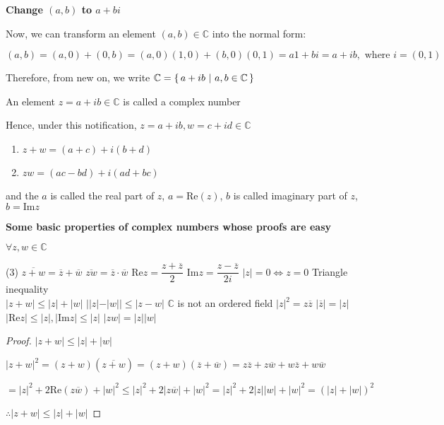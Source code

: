 \newpage

\textbf{Change $(a,b)$ to $a+bi$}

\begin{tcolorbox}
	Now, we can transform an element $(a,b) \in \mathbb C$ into the normal form:

$$(a,b) = (a,0)+(0,b) = (a,0)(1,0)+(b,0)(0,1) = a1+bi = a+ib, \text{ where } i = (0,1) $$

Therefore, from new on, we write $\mathbb C = \left\{ \,a+ib~|~a,b \in \mathbb C \,\right\}$

An element $z = a+ib \in \mathbb C$ is called a complex number

Hence, under this notification, $z = a+ib,w = c+id \in \mathbb C$

\begin{enumerate}
	\item $z+w = (a+c) + i(b+d)$
	\item $zw = (ac-bd) + i(ad + bc)$
\end{enumerate}

and the $a$ is called the real part of $z$, $a = \text{Re}(z)$, $b$ is called imaginary part of $z$, $b = \text{Im}z$

\end{tcolorbox}

\textbf{Some basic properties of complex numbers whose proofs are easy}

$\forall z,w \in \mathbb C$

\begin{tasks}(3)
	\task[$\cdot$] $\overline{z+w} = \overline{z} + \overline{w}$
	\task[$\cdot$] $\overline{zw} = \overline{z} \cdot \overline{w}$
	\task[$\cdot$] Re$z = \dfrac{z + \overline{z}}{2}$
	\task[$\cdot$] Im$z = \dfrac{z - \overline{z}}{2i}$
	\task[$\cdot$] $|z| = 0 \Leftrightarrow z = 0$
	\task[$\cdot$] Triangle inequality\\$|z+w| \leq |z| + |w|$
	\task[$\cdot$] $||z| - |w|| \leq |z - w|$
	\task[$\cdot$] $\mathbb C$ is not an ordered field
	\task[$\cdot$] $|z|^2 = z\overline{z}$
	\task[$\cdot$] $|\overline{z}| = |z|$
	\task[$\cdot$] $|\text{Re}z| \leq |z|,|\text{Im}z| \leq |z|$
	\task[$\cdot$] $|zw| = |z||w|$  
\end{tasks}

\begin{proof}
	$|z+w| \leq |z|+|w|$
	
	$|z+w|^2 = (z+w)(\overline{z+w}) = (z+w)(\overline{z}+\overline{w}) = z\overline{z}+z\overline{w}+w\overline{z}+w\overline{w}$
	
	$=|z|^2 + 2\text{Re}(z\overline{w})+|w|^2 \leq |z|^2 + 2|z\overline{w}|+|w|^2 = |z|^2 + 2|z||w|+|w|^2 = (|z|+|w|)^2$
	
	$\therefore |z+w| \leq |z| + |w|$
\end{proof}


